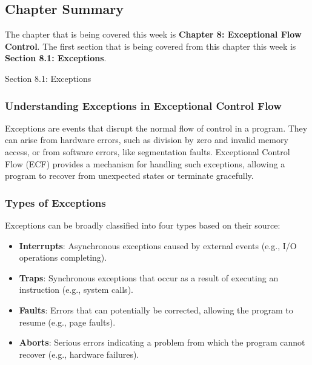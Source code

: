 \subsection{Chapter Summary}

The chapter that is being covered this week is \textbf{Chapter 8: Exceptional Flow Control}. The first section that is being covered from this chapter this week is \textbf{Section 8.1: Exceptions}.

\begin{notes}{Section 8.1: Exceptions}
    \subsubsection*{Understanding Exceptions in Exceptional Control Flow}

    Exceptions are events that disrupt the normal flow of control in a program. They can arise from hardware errors, such as division by zero and invalid memory access, or from software errors, like 
    segmentation faults. Exceptional Control Flow (ECF) provides a mechanism for handling such exceptions, allowing a program to recover from unexpected states or terminate gracefully. \vspace*{1em}
    
    \subsubsection*{Types of Exceptions}
    
    Exceptions can be broadly classified into four types based on their source:
    
    \begin{itemize}
        \item \textbf{Interrupts}: Asynchronous exceptions caused by external events (e.g., I/O operations completing).
        \item \textbf{Traps}: Synchronous exceptions that occur as a result of executing an instruction (e.g., system calls).
        \item \textbf{Faults}: Errors that can potentially be corrected, allowing the program to resume (e.g., page faults).
        \item \textbf{Aborts}: Serious errors indicating a problem from which the program cannot recover (e.g., hardware failures).
    \end{itemize}
    
    \vspace*{1em}
    

\end{notes}

